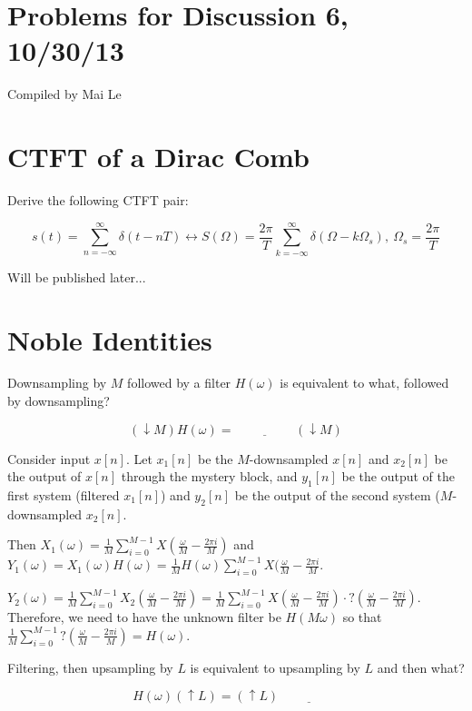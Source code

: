 \documentclass[11pt]{article}
\begin{document}
{\small
\section*{Problems for Discussion 6, 10/30/13}
Compiled by Mai Le
}

\section{CTFT of a Dirac Comb}

Derive the following CTFT pair:

\[
s(t) = \sum_{n=-\infty}^\infty \delta(t-nT) \leftrightarrow S(\Omega) = \frac{2 \pi}{T} \sum_{k=-\infty}^\infty \delta(\Omega - k\Omega_s),\ \Omega_s = \frac{2\pi}{T}
\]

{\color{blue}
Will be published later...
}

\section{Noble Identities}

Downsampling by $M$ followed by a filter $H(\omega)$ is equivalent to what, followed by downsampling?

\[
(\downarrow M)H(\omega) = \underline{\hspace{2cm}} (\downarrow M)
\]

{\color{blue}
Consider input $x[n]$. Let $x_1[n]$ be the $M$-downsampled $x[n]$ and $x_2[n]$ be the output of $x[n]$ through the mystery block, and $y_1[n]$ be the output of the first system (filtered $x_1[n]$) and $y_2[n]$ be the output of the second system ($M$-downsampled $x_2[n]$.

Then $X_1(\omega) = \frac{1}{M} \sum_{i=0}^{M-1}X(\frac{\omega}{M} - \frac{2 \pi i}{M})$ and $Y_1(\omega) = X_1(\omega)H(\omega) = \frac{1}{M} H(\omega) \sum_{i=0}^{M-1}X(\frac{\omega}{M} - \frac{2 \pi i}{M}$.

$Y_2(\omega) = \frac{1}{M} \sum_{i=0}^{M-1}X_2(\frac{\omega}{M} - \frac{2 \pi i}{M}) = \frac{1}{M} \sum_{i=0}^{M-1}X(\frac{\omega}{M} - \frac{2 \pi i}{M}) \cdot ? (\frac{\omega}{M} - \frac{2 \pi i}{M})$. Therefore, we need to have the unknown filter be $H(M\omega)$ so that $\frac{1}{M} \sum_{i=0}^{M-1} ? (\frac{\omega}{M} - \frac{2 \pi i}{M}) = H(\omega)$.

}

Filtering, then upsampling by $L$ is equivalent to upsampling by $L$ and then what?

\[
H(\omega)(\uparrow L) = (\uparrow L) \underline{\hspace{2cm}}
\]
\end{document}
